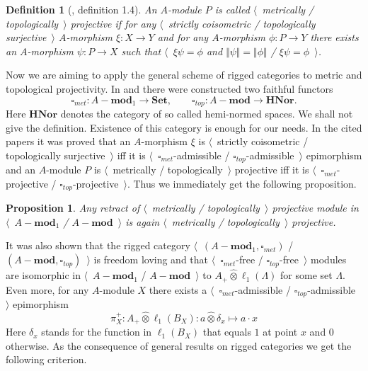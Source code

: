 \documentclass[12pt]{article}
\newcommand{\projtens}{\mathbin{\widehat{\otimes}}}
\newtheorem{proposition}[theorem]{Proposition}
\newtheorem{definition}[theorem]{Definition}
\begin{document}
\begin{definition}[\cite{HelMetrFrQMod}, definition 1.4]\label{MetTopProjMod} An $A$-module $P$ is called $\langle$~metrically / topologically~$\rangle$ projective if for any $\langle$~strictly coisometric / topologically surjective~$\rangle$ $A$-morphism $\xi:X\to Y$ and for any $A$-morphism $\phi:P\to Y$ there exists an $A$-morphism $\psi:P\to X$ such that $\langle$~$\xi\psi=\phi$ and $\Vert\psi\Vert=\Vert\phi\Vert$ / $\xi\psi=\phi$~$\rangle$.
\end{definition}

Now we are aiming to apply the general scheme of rigged categories to metric and topological projectivity. In \cite{HelMetrFrQMod} and \cite{ShtTopFrClassicQuantMod} there were constructed two faithful functors 
$$
\square_{met}:A-\mathbf{mod}_1\to\mathbf{Set},
\qquad
\square_{top}:A-\mathbf{mod}\to\mathbf{HNor}.
$$
Here $\mathbf{HNor}$ denotes the category of so called hemi-normed spaces. We shall not give the definition. Existence of this category is enough for our needs. In the cited papers it was proved that an $A$-morphism $\xi$ is $\langle$~strictly coisometric / topologically surjective~$\rangle$ iff it is $\langle$~$\square_{met}$-admissible / $\square_{top}$-admissible~$\rangle$ epimorphism and an $A$-module $P$ is $\langle$~metrically / topologically~$\rangle$ projective iff it is $\langle$~$\square_{met}$-projective / $\square_{top}$-projective~$\rangle$. Thus we immediately get the following proposition.

\begin{proposition}\label{RetrMetTopProjIsMetTopProj} Any retract of $\langle$~metrically / topologically~$\rangle$ projective module in $\langle$~$A-\mathbf{mod}_1$ / $A-\mathbf{mod}$~$\rangle$ is again $\langle$~metrically / topologically~$\rangle$ projective.
\end{proposition}

It was also shown that the rigged category $\langle$~$(A-\mathbf{mod}_1,\square_{met})$ / $(A-\mathbf{mod},\square_{top})$~$\rangle$ is freedom loving and that $\langle$~$\square_{met}$-free / $\square_{top}$-free~$\rangle$ modules are isomorphic in $\langle$~$A-\mathbf{mod}_1$ / $A-\mathbf{mod}$~$\rangle$ to $A_+\projtens \ell_1(\Lambda)$ for some set $\Lambda$. Even more, for any $A$-module $X$ there exists a $\langle$~$\square_{met}$-admissible / $\square_{top}$-admissible~$\rangle$ epimorphism
$$
\pi_X^+:A_+\projtens \ell_1(B_X):a\projtens \delta_x\mapsto a\cdot x
$$
Here $\delta_x$ stands for the function in $\ell_1(B_X)$ that equals $1$ at point $x$ and $0$ otherwise. As the consequence of general results on rigged categories we get the following criterion.
\end{document}
